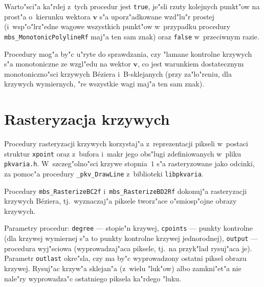 Warto"sci"a ka"rdej z~tych procedur jest \texttt{true}, je"sli rzuty
kolejnych punkt"ow na prost"a o~kierunku wektora $\bm{v}$ s"a uporz"adkowane
wzd"lu"r prostej (i~wsp"o"lrz"edne wagowe wszystkich punkt"ow w~przypadku
procedury \texttt{mbs\_MonotonicPolylineRf} maj"a ten sam znak)
oraz \texttt{false} w~przeciwnym razie.

\vspace{\medskipamount}
Procedury mog"a by"c u"ryte do sprawdzania, czy "lamane kontrolne krzywych
s"a monotoniczne ze wzgl"edu na wektor $\bm{v}$, co jest warunkiem
dostatecznym monotoniczno"sci krzywych B\'{e}ziera i~B-sklejanych (przy
za"lo"reniu, dla krzywych wymiernych, "re wszystkie wagi maj"a ten sam
znak).


\newpage
\section{Rasteryzacja krzywych}

Procedury rasteryzacji krzywych korzystaj"a z~reprezentacji pikseli
w~postaci struktur \texttt{xpoint} oraz z~bufora i~makr jego obs"lugi
zdefiniowanych w~pliku \texttt{pkvaria.h}. W~szczeg"olno"sci krzywe
stopnia~$1$ s"a rasteryzowane jako odcinki, za pomoc"a procedury
\texttt{\_pkv\_DrawLine} z~biblioteki \texttt{libpkvaria}.

\vspace{\bigskipamount}
Procedury \texttt{mbs\_RasterizeBC2f} i~\texttt{mbs\_RasterizeBD2Rf}
dokonuj"a rasteryzacji krzywych B\'{e}ziera, tj.\ wyznaczaj"a piksele
tworz"ace o"smiosp"ojne obrazy krzywych.

Parametry procedur: \texttt{degree} --- stopie"n krzywej, \texttt{cpoints}
--- punkty kontrolne (dla krzywej wymiernej s"a to punkty kontrolne krzywej
jednorodnej), \texttt{output} --- procedura wyj"sciowa (wyprowadzaj"aca
piksele, tj.\ na przyk"lad rysuj"aca je). Parametr \texttt{outlast}
okre"sla, czy ma by"c wyprowadzony ostatni piksel obrazu krzywej.
Rysuj"ac krzyw"a sklejan"a (z~wielu "luk"ow) albo zamkni"et"a nie nale"ry
wyprowadza"c ostatniego piksela ka"rdego "luku.

